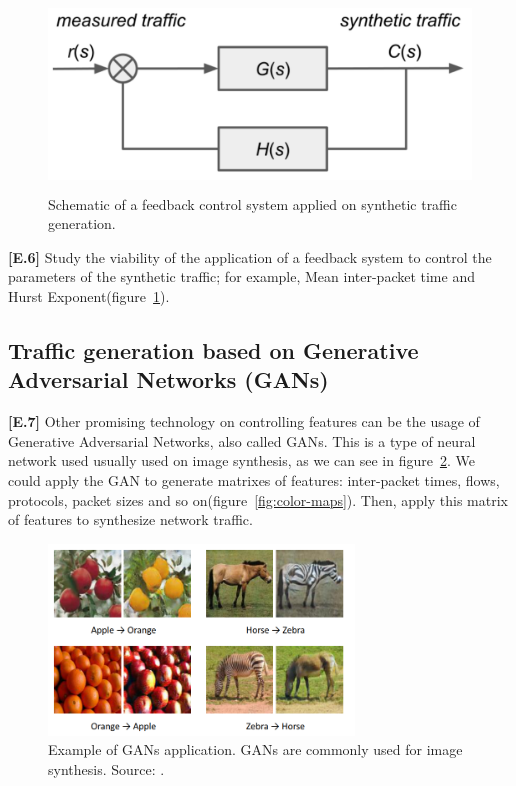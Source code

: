 \begin{figure}[!ht]
    \centering
    \includegraphics[height=2.0in]{figures/ch6/control-system}
    \caption{Schematic of a feedback control system applied on synthetic traffic generation.}
    \label{fig:control-system}
\end{figure}

\textbf{[E.6]} Study the viability of the application of a feedback system to control the parameters of the synthetic traffic; for example, Mean inter-packet time and Hurst Exponent(figure~\ref{fig:control-system}).

\subsection{Traffic generation based on Generative Adversarial Networks (GANs)}

\textbf{[E.7]} Other promising technology on controlling features can be the usage of Generative Adversarial Networks, also called \acrshort{GAN}s\cite{gans-paper}. This is a type of neural network used usually used on image synthesis, as we can see in figure~\ref{fig:gans-example}. We could apply the GAN to generate matrixes of features: inter-packet times, flows, protocols, packet sizes and so on(figure~\ref{fig:color-maps}). Then, apply this matrix of features to synthesize network traffic. 

\begin{figure}[!ht]
    \centering
    \includegraphics[height=2.0in]{figures/ch6/gans-example}
    \caption{Example of GANs application. GANs are commonly used for image synthesis. Source: \cite{gans-survey}. }
    \label{fig:gans-example}
\end{figure}


